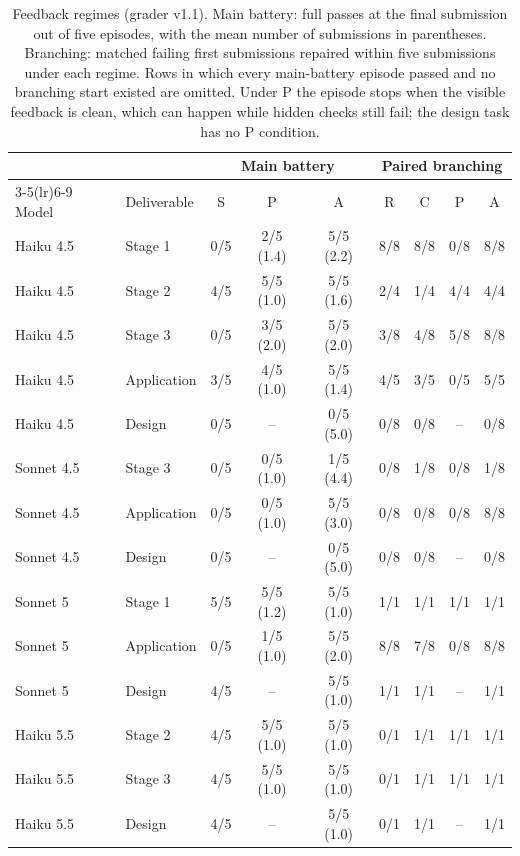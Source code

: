 \begin{table}[t]
\caption{Feedback regimes (grader v1.1). Main battery: full passes at the final submission out of five episodes, with the mean number of submissions in parentheses. Branching: matched failing first submissions repaired within five submissions under each regime. Rows in which every main-battery episode passed and no branching start existed are omitted. Under P the episode stops when the visible feedback is clean, which can happen while hidden checks still fail; the design task has no P condition.}
\label{tab:feedback}
\footnotesize
\setlength{\tabcolsep}{3.5pt}
\begin{tabular}{llccccccc}
\toprule
& & \multicolumn{3}{c}{Main battery} & \multicolumn{4}{c}{Paired branching}\\
\cmidrule(lr){3-5}\cmidrule(lr){6-9}
Model & Deliverable & S & P & A & R & C & P & A\\
\midrule
Haiku 4.5 & Stage 1 & 0/5 & 2/5 (1.4) & 5/5 (2.2) & 8/8 & 8/8 & 0/8 & 8/8\\
Haiku 4.5 & Stage 2 & 4/5 & 5/5 (1.0) & 5/5 (1.6) & 2/4 & 1/4 & 4/4 & 4/4\\
Haiku 4.5 & Stage 3 & 0/5 & 3/5 (2.0) & 5/5 (2.0) & 3/8 & 4/8 & 5/8 & 8/8\\
Haiku 4.5 & Application & 3/5 & 4/5 (1.0) & 5/5 (1.4) & 4/5 & 3/5 & 0/5 & 5/5\\
Haiku 4.5 & Design & 0/5 & -- & 0/5 (5.0) & 0/8 & 0/8 & -- & 0/8\\
Sonnet 4.5 & Stage 3 & 0/5 & 0/5 (1.0) & 1/5 (4.4) & 0/8 & 1/8 & 0/8 & 1/8\\
Sonnet 4.5 & Application & 0/5 & 0/5 (1.0) & 5/5 (3.0) & 0/8 & 0/8 & 0/8 & 8/8\\
Sonnet 4.5 & Design & 0/5 & -- & 0/5 (5.0) & 0/8 & 0/8 & -- & 0/8\\
Sonnet 5 & Stage 1 & 5/5 & 5/5 (1.2) & 5/5 (1.0) & 1/1 & 1/1 & 1/1 & 1/1\\
Sonnet 5 & Application & 0/5 & 1/5 (1.0) & 5/5 (2.0) & 8/8 & 7/8 & 0/8 & 8/8\\
Sonnet 5 & Design & 4/5 & -- & 5/5 (1.0) & 1/1 & 1/1 & -- & 1/1\\
Haiku 5.5 & Stage 2 & 4/5 & 5/5 (1.0) & 5/5 (1.0) & 0/1 & 1/1 & 1/1 & 1/1\\
Haiku 5.5 & Stage 3 & 4/5 & 5/5 (1.0) & 5/5 (1.0) & 0/1 & 1/1 & 1/1 & 1/1\\
Haiku 5.5 & Design & 4/5 & -- & 5/5 (1.0) & 0/1 & 1/1 & -- & 1/1\\
\bottomrule
\end{tabular}
\end{table}
